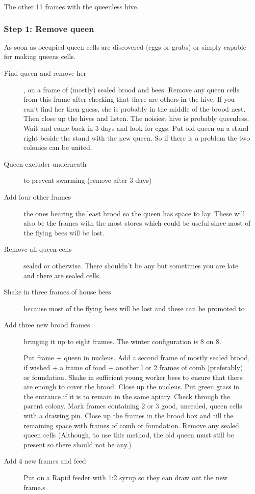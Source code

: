 The other 11 frames with the queenless hive.

\subsubsection*{Step 1: Remove queen}

As soon as occupied queen cells are discovered (eggs or grubs) or simply capable for making queens cells.

\begin{description}
  \item[Find queen and remove her], on a frame of (mostly) sealed brood and bees.
    Remove any queen cells from this frame after checking that there are others in the hive.
    If you can't find her  then guess, she is probably in the middle of the brood nest.
    Then close up the hives and listen.  The noisiest hive is probably queenless.
    Wait and come back in 3 days and look for eggs.
    Put old queen on a stand right beside the stand with the new queen.
  So if there is a problem the two colonies can be united.
  \item[Queen excluder underneath] to prevent swarming (remove after 3 days)
  \item[Add four other frames] the ones bearing the least brood so the queen has space to lay.
    These will also be the frames with the most stores which could be useful since most of the flying bees will be lost.
  \item[Remove all queen cells] sealed or otherwise.
    There shouldn't be any but sometimes you are late and there are sealed cells.
  \item[Shake in three frames of house bees] because most of the flying bees will be lost and these can be promoted to 
  \item[Add three new brood frames] bringing it up to eight frames.  The winter configuration is 8 on 8.
  
  
Put frame + queen in nucleus.
Add a second frame of mostly sealed brood, if wished + a frame of food + another l or 2
frames of comb (preferably) or foundation.
Shake in sufficient young worker bees to ensure that there are enough to cover the brood.
Close up the nucleus. Put green grass in the entrance if it is to remain in the same apiary.
Check through the parent colony.  Mark frames containing 2 or 3 good, unsealed, queen cells with a drawing pin.
Close up the frames in the brood box and till the remaining space with frames of comb or foundation.
  Remove any sealed queen cells
  (Although, to use this method, the old queen must still be present so there should not be any.)
  \item[Add 4 new frames and feed] Put on a Rapid feeder with 1:2 syrup so they can draw out the new frame.s
\end{description}

